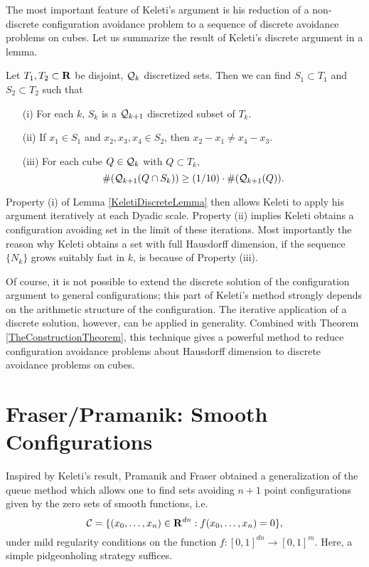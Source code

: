 The most important feature of Keleti's argument is his reduction of a non-discrete configuration avoidance problem to a sequence of discrete avoidance problems on cubes. Let us summarize the result of Keleti's discrete argument in a lemma.

\begin{lemma} \label{KeletiDiscreteLemma}
    Let $T_1, T_2 \subset \operatorname{\mathbf{R}}$ be disjoint, $\operatorname{\mathcal{Q}}_k$ discretized sets. Then we can find $S_1 \subset T_1$ and $S_2 \subset T_2$ such that
    \begin{enumerate}
        \item[(i)] For each $k$, $S_k$ is a $\operatorname{\mathcal{Q}}_{k+1}$ discretized subset of $T_k$.
        \item[(ii)] If $x_1 \in S_1$ and $x_2,x_3,x_4 \in S_2$, then $x_2 - x_1 \neq x_4 - x_3$.
        \item[(iii)] For each cube $Q \in \operatorname{\mathcal{Q}}_k$ with $Q \subset T_k$,
        \[ \#(\operatorname{\mathcal{Q}}_{k+1}(Q \cap S_k)) \geq (1/10) \cdot \#(\operatorname{\mathcal{Q}}_{k+1}(Q)). \]
    \end{enumerate}
\end{lemma}
%
Property (i) of Lemma \ref{KeletiDiscreteLemma} then allows Keleti to apply his argument iteratively at each Dyadic scale. Property (ii) implies Keleti obtains a configuration avoiding set in the limit of these iterations. Most importantly the reason why Keleti obtains a set with full Hausdorff dimension, if the sequence $\{ N_k \}$ grows suitably fast in $k$, is because of Property (iii).

Of course, it is not possible to extend the discrete solution of the configuration argument to general configurations; this part of Keleti's method strongly depends on the arithmetic structure of the configuration. The iterative application of a discrete solution, however, can be applied in generality. Combined with Theorem \ref{TheConstructionTheorem}, this technique gives a powerful method to reduce configuration avoidance problems about Hausdorff dimension to discrete avoidance problems on cubes.







\section{Fraser/Pramanik: Smooth Configurations}

Inspired by Keleti's result, Pramanik and Fraser obtained a generalization of the queue method which allows one to find sets avoiding $n+1$ point configurations given by the zero sets of smooth functions, i.e.
%
\[ \operatorname{\mathcal{C}} = \{ (x_0, \dots, x_n) \in \operatorname{\mathbf{R}}^{dn} : f(x_0, \dots, x_n) = 0 \}, \]
%
under mild regularity conditions on the function $f: [0,1]^{dn} \to [0,1]^m$. Here, a simple pidgeonholing strategy suffices.

